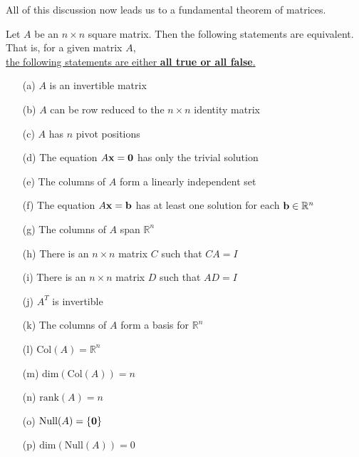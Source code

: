 All of this discussion now leads us to a fundamental theorem of matrices.
\begin{thm}
    Let $A$ be an $n \times n$ square matrix.  Then the following statements are
    equivalent.  That is, for a given matrix $A$, \\
    \underline{the following statements are either {\bf all true or
    all false}.}
    \begin{enumerate}
        \item[(a)] $A$ is an invertible matrix
        \item[(b)] $A$ can be row reduced to the $n \times n$ identity matrix
        \item[(c)] $A$ has $n$ pivot positions
        \item[(d)] The equation $A {\bf x} = {\bf 0}$ has only the trivial solution
        \item[(e)] The columns of $A$ form a linearly independent set
        \item[(f)] The equation $A {\bf x} = {\bf b}$ has at least one solution for each ${\bf b} \in
            \mathbb{R}^n$
        \item[(g)] The columns of $A$ span $\mathbb{R}^n$
        \item[(h)] There is an $n \times n$ matrix $C$ such that $CA = I$
        \item[(i)] There is an $n \times n$ matrix $D$ such that $AD = I$
        \item[(j)] $A^T$ is invertible
        \item[(k)] The columns of $A$ form a basis for $\mathbb{R}^n$
        \item[(l)] $\text{Col}(A) = \mathbb{R}^n$
        \item[(m)] $\text{dim}(\text{Col}(A)) = n$
        \item[(n)] $\text{rank}(A) = n$
        \item[(o)] $\text{Null}(A) = \{ {\bf 0} \}$
        \item[(p)] $\text{dim}(\text{Null}(A)) = 0$
    \end{enumerate}
\end{thm}

